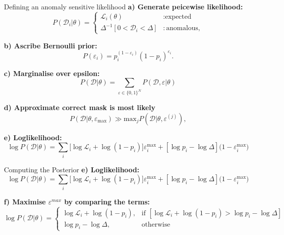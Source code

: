 \documentclass[aspectratio=169]{beamer}
\begin{document}
\begin{frame}{Defining an anomaly sensitive likelihood}
  \footnotesize
  \textbf{a) Generate peicewise likelihood:}
  \begin{equation}
      P(\mathcal{D}_i|\theta) = \begin{cases}
          \mathcal{L}_i(\theta) &: \text{expected}\\
          \Delta^{-1}[ 0<\mathcal{D}_i<\Delta] &: \text{anomalous},
      \end{cases}
  \end{equation}

  \textbf{b) Ascribe Bernoulli prior:}
  \begin{equation}
      P(\varepsilon_i) = p_i^{(1-\varepsilon_i)}(1-p_i)^{\varepsilon_i}.
  \end{equation}

  \textbf{c) Marginalise over epsilon:}
  \begin{equation}
      P(\mathcal{D} | \theta) =\sum_{\varepsilon \in \{ 0, 1 \} ^N}P(\mathcal{D},\varepsilon|\theta)
    \end{equation}


    \textbf{d) Approximate correct mask is most likely}
     \begin{equation}
 P(\mathcal{D}|\theta, \varepsilon_{\mathrm{max}}) \gg \mathrm{max}_j P(\mathcal{D}|\theta,\varepsilon^{(j)})\label{eq:nlo},
\end{equation}

  \textbf{e) Loglikelihood:}
  \begin{equation}
      \log{P(\mathcal{D}|\theta)} = \sum_{i}[{\log{\mathcal{L}_i}+\log({1-p_i})]\varepsilon^{\mathrm{max}}_i + [\log{p}_i - \log{\Delta}](1 - \varepsilon^\mathrm{max}_i})
  \end{equation}
\end{frame}

\begin{frame}{Computing the Posterior}
    \footnotesize
    \textbf{e) Loglikelihood:}
  \begin{equation}\tag{6}
      \log{P(\mathcal{D}|\theta)} = \sum_{i}[{\log{\mathcal{L}_i}+\log({1-p_i})]\varepsilon^{\mathrm{max}}_i + [\log{p}_i - \log{\Delta}](1 - \varepsilon^\mathrm{max}_i})
  \end{equation}

    \footnotesize
    \textbf{f) Maximise $\varepsilon^{max}$ by comparing the terms:}
    \begin{equation}\tag{7}
    \log P(\mathcal{D}|\theta) =
    \begin{cases}
    \log \mathcal{L}_i + \log(1 - p_i), & \text{if } [\log \mathcal{L}_i + \log(1 - p_i) > \log p_i - \log \Delta] \\
    \log p_i - \log \Delta, & \text{otherwise}
    \end{cases}
    \end{equation}
\end{frame}
\end{document}
